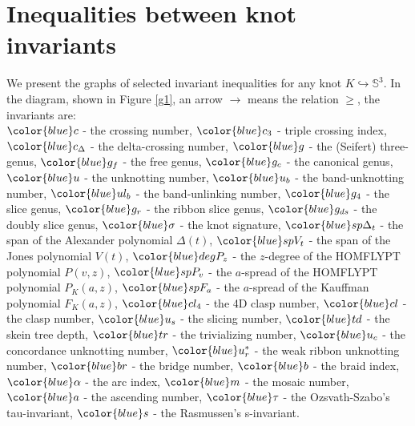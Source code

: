 \documentclass[pdftex, a4paper, 12pt, oneside]{amsart}
\numberwithin{equation}{section}
\theoremstyle{plain}
\theoremstyle{definition}
\begin{document}
	
	
	
	\section{Inequalities between knot invariants}\label{s3}
	
	
	
	We present the graphs of selected invariant inequalities for any knot $K\hookrightarrow \mathbb{S}^3$. In the diagram, shown in Figure \ref{g1}, an arrow $\rightarrow$ means the relation $\geq$, the invariants are: 
	\ \\
	$\color{blue} c$ -  the crossing number,
	$\color{blue} c_3$ -  triple crossing index,
	$\color{blue} c_{\Delta}$ -  the delta-crossing number,
	$\color{blue} g$ - the (Seifert) three-genus,
	$\color{blue} g_f$ - the free genus,
	$\color{blue} g_c$ - the canonical genus,
	$\color{blue} u$ - the unknotting number,
	$\color{blue} u_b$ - the band-unknotting number,
	$\color{blue} ul_b$ - the band-unlinking number,
	$\color{blue} g_4$ - the slice genus,
	$\color{blue} g_r$ - the ribbon slice genus,
	$\color{blue} g_{ds}$ - the doubly slice genus, 
	$\color{blue} \sigma$ - the knot signature,
	$\color{blue} sp\Delta_t$ - the span of the Alexander polynomial $\Delta(t)$,
	$\color{blue} spV_t$ - the span of the Jones polynomial $V(t)$,
	$\color{blue} degP_z$ - the $z$-degree of the HOMFLYPT polynomial $P(v,z)$,
	$\color{blue} spP_v$ - the $a$-spread of the HOMFLYPT polynomial $P_K(a,z)$,
	$\color{blue} spF_a$ - the $a$-spread of the Kauffman polynomial $F_K(a,z)$,
	$\color{blue} cl_4$ - the 4D clasp number,
	$\color{blue} cl$ - the clasp number,
	$\color{blue} u_s$ - the slicing number,
	$\color{blue} td$ - the skein tree depth,
	$\color{blue} tr$ - the trivializing number,
	$\color{blue} u_c$ - the concordance unknotting number,
	$\color{blue} u^*_r$ - the weak ribbon unknotting number, 
	$\color{blue} br$ - the bridge number,
	$\color{blue} b$ - the braid index,
	$\color{blue} \alpha$ - the arc index,
	$\color{blue} m$ - the mosaic number,
	$\color{blue} a$ - the ascending number,
	$\color{blue} \tau$ - the Ozsvath-Szabo's tau-invariant,
	$\color{blue} s$ - the Rasmussen's s-invariant.
	
\end{document}
